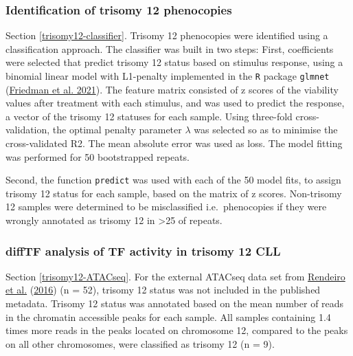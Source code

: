 \documentclass[11pt, a4paper, twosided]{book}
\begin{document}
\hypertarget{trisomy12-classifier-method}{%
\subsubsection{Identification of trisomy 12 phenocopies}\label{trisomy12-classifier-method}}

Section \ref{trisomy12-classifier}. Trisomy 12 phenocopies were identified using a classification approach. The classifier was built in two steps: First, coefficients were selected that predict trisomy 12 status based on stimulus response, using a binomial linear model with L1-penalty implemented in the \texttt{R} package \texttt{glmnet} (\protect\hyperlink{ref-R-glmnet}{Friedman et al. 2021}). The feature matrix consisted of z scores of the viability values after treatment with each stimulus, and was used to predict the response, a vector of the trisomy 12 statuses for each sample. Using three-fold cross-validation, the optimal penalty parameter \(\lambda\) was selected so as to minimise the cross-validated R2. The mean absolute error was used as loss. The model fitting was performed for 50 bootstrapped repeats.

Second, the function \texttt{predict} was used with each of the 50 model fits, to assign trisomy 12 status for each sample, based on the matrix of z scores. Non-trisomy 12 samples were determined to be misclassified i.e.~phenocopies if they were wrongly annotated as trisomy 12 in \textgreater25 of repeats.

\hypertarget{trisomy12-ATACseq-method}{%
\subsubsection{diffTF analysis of TF activity in trisomy 12 CLL}\label{trisomy12-ATACseq-method}}

Section \ref{trisomy12-ATACseq}. For the external ATACseq data set from \protect\hyperlink{ref-Rendeiro2016}{Rendeiro et al.} (\protect\hyperlink{ref-Rendeiro2016}{2016}) (n = 52), trisomy 12 status was not included in the published metadata. Trisomy 12 status was annotated based on the mean number of reads in the chromatin accessible peaks for each sample. All samples containing 1.4 times more reads in the peaks located on chromosome 12, compared to the peaks on all other chromosomes, were classified as trisomy 12 (n = 9).
\end{document}
